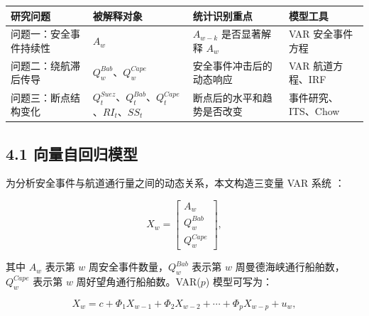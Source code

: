 \documentclass[
]{ctexart}
\begin{document}
\begin{longtable}[]{@{}
  >{\raggedright\arraybackslash}p{}
  >{\raggedright\arraybackslash}p{}
  >{\raggedright\arraybackslash}p{}
  >{\raggedright\arraybackslash}p{}@{}}
\toprule\noalign{}
\begin{minipage}[b]{\linewidth}\raggedright
研究问题
\end{minipage} & \begin{minipage}[b]{\linewidth}\raggedright
被解释对象
\end{minipage} & \begin{minipage}[b]{\linewidth}\raggedright
统计识别重点
\end{minipage} & \begin{minipage}[b]{\linewidth}\raggedright
模型工具
\end{minipage} \\
\midrule\noalign{}
\endhead
\bottomrule\noalign{}
\endlastfoot
问题一：安全事件持续性 & \(A_w\) & \(A_{w-k}\) 是否显著解释 \(A_w\) &
VAR 安全事件方程 \\
问题二：绕航滞后传导 & \(Q^{Bab}_w\)、\(Q^{Cape}_w\) &
安全事件冲击后的动态响应 & VAR 航道方程、IRF \\
问题三：断点结构变化 &
\(Q^{Suez}_t\)、\(Q^{Bab}_t\)、\(Q^{Cape}_t\)、\(RI_t\)、\(SS_t\) &
断点后的水平和趋势是否改变 & 事件研究、ITS、Chow \\
\end{longtable}

\subsection{4.1
向量自回归模型}\label{ux5411ux91cfux81eaux56deux5f52ux6a21ux578b}

为分析安全事件与航道通行量之间的动态关系，本文构造三变量 VAR 系统
\citep{sims1980macroeconomics,lutkepohl2005new}：

\[
X_w =
\begin{bmatrix}
A_w \\
Q^{Bab}_w \\
Q^{Cape}_w
\end{bmatrix},
\]

其中 \(A_w\) 表示第 \(w\) 周安全事件数量，\(Q^{Bab}_w\) 表示第 \(w\)
周曼德海峡通行船舶数，\(Q^{Cape}_w\) 表示第 \(w\)
周好望角通行船舶数。VAR(\(p\)) 模型可写为：

\[
X_w=c+\Phi_1X_{w-1}+\Phi_2X_{w-2}+\cdots+\Phi_pX_{w-p}+u_w,
\]
\end{document}
